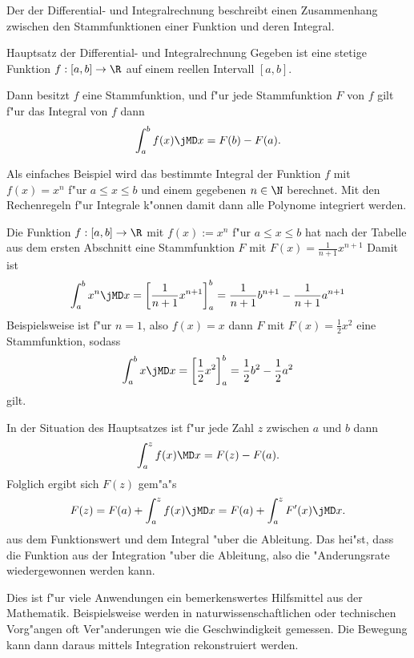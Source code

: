 



\begin{MContent}


Der  der Differential- und Integralrechnung 
beschreibt einen Zusammenhang zwischen den Stammfunktionen einer Funktion und 
deren Integral.

\begin{MXInfo}{Hauptsatz der Differential- und Integralrechnung} 
Gegeben ist eine stetige Funktion $f: [a, b] \rightarrow \R$ auf einem reellen 
Intervall $[a, b]$. 

Dann besitzt $f$ eine Stammfunktion, und f"ur jede Stammfunktion $F$ von $f$ 
gilt f"ur das Integral von $f$ dann
\[
\int_{a}^{b} f(x) \jMD x = F(b) - F(a). %
\]
\end{MXInfo}

Als einfaches Beispiel wird das bestimmte Integral der Funktion $f$ mit 
$f(x) = x^n$ f"ur $a \leq x \leq b$ und einem gegebenen $n \in \N$ berechnet.
Mit den Rechenregeln f"ur Integrale k"onnen damit dann alle Polynome integriert
werden.

\begin{MExample}
Die Funktion $f: [a, b] \rightarrow \R$ mit $f(x) := x^n$ f"ur $a \leq x \leq b$ 
hat nach der Tabelle aus dem ersten Abschnitt eine Stammfunktion $F$ mit 
$F(x) = \frac{1}{n+1} x^{n+1}$
Damit ist
\[
\int_a^b x^n \jMD x = \left[\frac{1}{n+1} x^{n+1}\right]_a^b %
 = \frac{1}{n+1} b^{n+1} - \frac{1}{n+1} a^{n+1} %
\]
Beispielsweise ist f"ur $n = 1$, also $f(x) = x$ dann
$F$ mit $F(x) = \frac{1}{2} x^2$ eine Stammfunktion, sodass
\[
\int_a^b x \jMD x = \left[\frac{1}{2} x^2\right]_a^b %
 = \frac{1}{2} b^2 - \frac{1}{2} a^2 %
\]
gilt. 
\end{MExample}

In der Situation des Hauptsatzes ist f"ur jede Zahl $z$ zwischen $a$ und $b$ dann
\[
\int_{a}^{z} f(x) \MD x = F(z) - F(a). %
\]
Folglich ergibt sich $F(z)$ gem"a"s
\begin{equation}
F(z) = F(a) + \int_{a}^{z} f(x) \jMD x = F(a) + \int_{a}^{z} F'(x) \jMD x. %
\end{equation}
aus dem Funktionswert und dem Integral "uber die Ableitung. Das hei"st, dass 
die Funktion aus der Integration "uber die Ableitung, also die "Anderungsrate
wiedergewonnen werden kann.

Dies ist f"ur viele Anwendungen ein bemerkenswertes Hilfsmittel aus der 
Mathematik. Beispielsweise werden in naturwissenschaftlichen oder technischen 
Vorg"angen oft Ver"anderungen wie die Geschwindigkeit gemessen. Die Bewegung 
kann dann daraus mittels Integration rekonstruiert werden.


\end{MContent}


